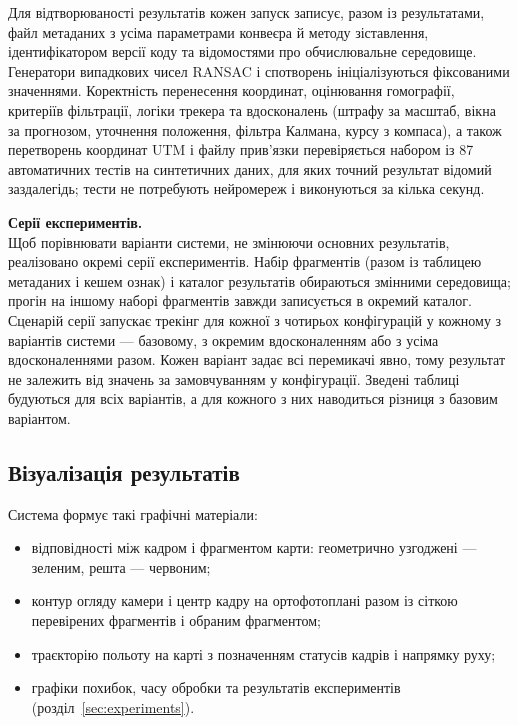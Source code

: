 \documentclass[a4paper, 12pt, titlepage]{article}
\begin{document}
Для відтворюваності результатів кожен запуск записує, разом із результатами, файл метаданих з усіма параметрами конвеєра й методу зіставлення, ідентифікатором версії коду та відомостями про обчислювальне середовище. Генератори випадкових чисел RANSAC і спотворень ініціалізуються фіксованими значеннями. Коректність перенесення координат, оцінювання гомографії, критеріїв фільтрації, логіки трекера та вдосконалень (штрафу за масштаб, вікна за прогнозом, уточнення положення, фільтра Калмана, курсу з компаса), а також перетворень координат UTM і файлу прив'язки перевіряється набором із 87 автоматичних тестів на синтетичних даних, для яких точний результат відомий заздалегідь; тести не потребують нейромереж і виконуються за кілька секунд.

\textbf{Серії експериментів.}\\
Щоб порівнювати варіанти системи, не змінюючи основних результатів, реалізовано окремі серії експериментів. Набір фрагментів (разом із таблицею метаданих і кешем ознак) і каталог результатів обираються змінними середовища; прогін на іншому наборі фрагментів завжди записується в окремий каталог. Сценарій серії запускає трекінг для кожної з чотирьох конфігурацій у кожному з варіантів системи --- базовому, з окремим вдосконаленням або з усіма вдосконаленнями разом. Кожен варіант задає всі перемикачі явно, тому результат не залежить від значень за замовчуванням у конфігурації. Зведені таблиці будуються для всіх варіантів, а для кожного з них наводиться різниця з базовим варіантом.

\subsection{Візуалізація результатів}

Система формує такі графічні матеріали:
\begin{itemize}
    \item відповідності між кадром і фрагментом карти: геометрично узгоджені --- зеленим, решта --- червоним;
    \item контур огляду камери і центр кадру на ортофотоплані разом із сіткою перевірених фрагментів і обраним фрагментом;
    \item траєкторію польоту на карті з позначенням статусів кадрів і напрямку руху;
    \item графіки похибок, часу обробки та результатів експериментів (розділ~\ref{sec:experiments}).
\end{itemize}
\end{document}
